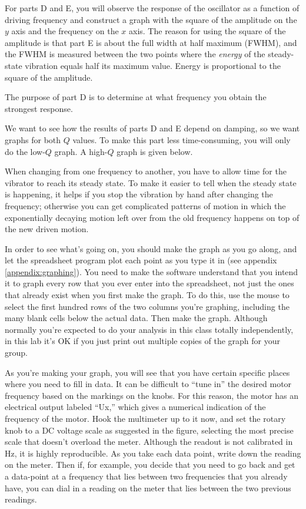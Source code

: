 
For parts D and E, you will observe the response of the oscillator
as a function of driving frequency and construct a graph 
with the square of the
amplitude on the $y$ axis and the frequency on the $x$ axis.
The reason for using the square of the amplitude is that part E
is about the full width at half maximum (FWHM), and the
FWHM is
measured between the two points where the \emph{energy} of
the steady-state vibration equals half its maximum value.
Energy is proportional to the square of the amplitude.

The purpose of part D is to determine at what frequency you
obtain the strongest response.

We want to see how the results of parts D and E depend on damping,
so we want graphs for both $Q$ values.
To make this part less time-consuming, you will only do the low-$Q$
graph. A high-$Q$ graph is given below.




When changing from one frequency to another, you have to allow time
for the vibrator to reach its steady state. To make it easier to
tell when the steady state is happening, it helps if you stop the vibration
by hand after changing the frequency; otherwise you can get complicated
patterns of motion in which the exponentially decaying motion left over
from the old frequency happens on top of the new driven motion.

In order to see what's going on, you should make the graph as
you go along, and let the spreadsheet program plot each point
as you type it in (see appendix \ref{appendix:graphing}).  You need to make the software
understand that you intend it to graph every row that you ever
enter into the spreadsheet, not just the ones that already exist when you first
make the graph. To do this, use the mouse to select the first hundred rows of the
two columns you're graphing, including the many blank cells below the actual data.
Then make the graph. Although normally you're expected to do your analysis in this
class totally independently, in this lab it's OK if you just print out multiple
copies of the graph for your group.

As you're making your graph, you will see that you have certain specific
places where you need to fill in data. It can be difficult to ``tune in''
the desired motor frequency based on the markings on the knobs.
For this reason, the motor has an electrical output labeled ``Ux,''
which gives a numerical indication of the frequency of the motor. Hook the multimeter up
to it now, and set the rotary knob to a DC voltage scale as suggested in the figure,
selecting the most precise scale that doesn't overload the meter. Although the readout
is not calibrated in Hz, it is highly reproducible. As you take each data point,
write down the reading on the meter. Then if, for example, you decide that you need
to go back and get a data-point at a frequency that lies between two frequencies
that you already have, you can dial in a reading on the meter that lies between the
two previous readings.

